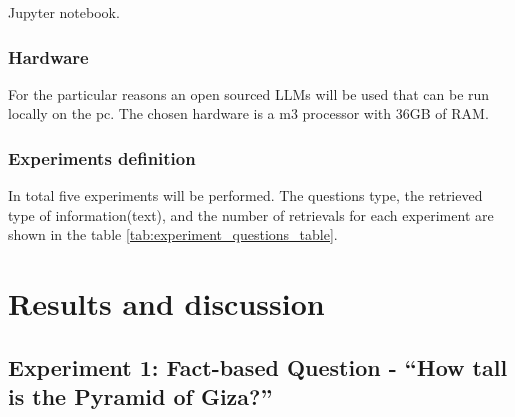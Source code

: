 \documentclass{wseas}
\begin{document}
Jupyter notebook.

\subsubsection{Hardware}

For the particular reasons an open sourced LLMs will be used that can be
run locally on the pc. The chosen hardware is a m3 processor with 36GB
of RAM.

\subsubsection{Experiments definition}

In total five experiments will be performed. The questions type, the retrieved type of information(text), 
and the number of retrievals for each experiment are shown in the table \ref{tab:experiment_questions_table}. 

\begin{table}[htbp]
  \caption{Experiment description} %
  \label{tab:experiment_questions_table}  %
    \centering
\end{table}

    

\section{Results and discussion}

\subsection{Experiment 1: Fact-based Question - ``How tall is the
Pyramid of
Giza?''}
\end{document}

